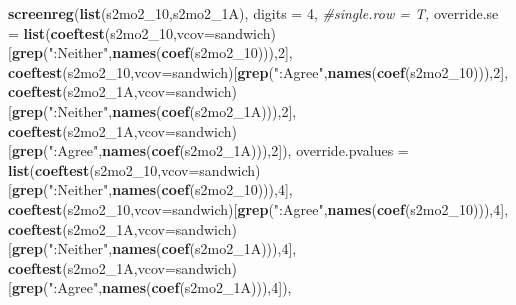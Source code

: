 \documentclass[
]{article}
\newenvironment{Shaded}{\begin{snugshade}}{\end{snugshade}}
\newcommand{\CommentTok}[1]{\textcolor[rgb]{0.56,0.35,0.01}{\textit{#1}}}
\newcommand{\DataTypeTok}[1]{\textcolor[rgb]{0.13,0.29,0.53}{#1}}
\newcommand{\DecValTok}[1]{\textcolor[rgb]{0.00,0.00,0.81}{#1}}
\newcommand{\KeywordTok}[1]{\textcolor[rgb]{0.13,0.29,0.53}{\textbf{#1}}}
\newcommand{\NormalTok}[1]{#1}
\newcommand{\StringTok}[1]{\textcolor[rgb]{0.31,0.60,0.02}{#1}}
\begin{document}
\begin{Shaded}
\begin{Highlighting}[]
\KeywordTok{screenreg}\NormalTok{(}\KeywordTok{list}\NormalTok{(s2mo2_}\DecValTok{10}\NormalTok{,s2mo2_1A), }\DataTypeTok{digits =} \DecValTok{4}\NormalTok{, }\CommentTok{#single.row = T,}
          \DataTypeTok{override.se =} \KeywordTok{list}\NormalTok{(}\KeywordTok{coeftest}\NormalTok{(s2mo2_}\DecValTok{10}\NormalTok{,}\DataTypeTok{vcov=}\NormalTok{sandwich)[}\KeywordTok{grep}\NormalTok{(}\StringTok{":Neither"}\NormalTok{,}\KeywordTok{names}\NormalTok{(}\KeywordTok{coef}\NormalTok{(s2mo2_}\DecValTok{10}\NormalTok{))),}\DecValTok{2}\NormalTok{],}
                             \KeywordTok{coeftest}\NormalTok{(s2mo2_}\DecValTok{10}\NormalTok{,}\DataTypeTok{vcov=}\NormalTok{sandwich)[}\KeywordTok{grep}\NormalTok{(}\StringTok{":Agree"}\NormalTok{,}\KeywordTok{names}\NormalTok{(}\KeywordTok{coef}\NormalTok{(s2mo2_}\DecValTok{10}\NormalTok{))),}\DecValTok{2}\NormalTok{],}
                             \KeywordTok{coeftest}\NormalTok{(s2mo2_1A,}\DataTypeTok{vcov=}\NormalTok{sandwich)[}\KeywordTok{grep}\NormalTok{(}\StringTok{":Neither"}\NormalTok{,}\KeywordTok{names}\NormalTok{(}\KeywordTok{coef}\NormalTok{(s2mo2_1A))),}\DecValTok{2}\NormalTok{],}
                             \KeywordTok{coeftest}\NormalTok{(s2mo2_1A,}\DataTypeTok{vcov=}\NormalTok{sandwich)[}\KeywordTok{grep}\NormalTok{(}\StringTok{":Agree"}\NormalTok{,}\KeywordTok{names}\NormalTok{(}\KeywordTok{coef}\NormalTok{(s2mo2_1A))),}\DecValTok{2}\NormalTok{]),}
          \DataTypeTok{override.pvalues =} \KeywordTok{list}\NormalTok{(}\KeywordTok{coeftest}\NormalTok{(s2mo2_}\DecValTok{10}\NormalTok{,}\DataTypeTok{vcov=}\NormalTok{sandwich)[}\KeywordTok{grep}\NormalTok{(}\StringTok{":Neither"}\NormalTok{,}\KeywordTok{names}\NormalTok{(}\KeywordTok{coef}\NormalTok{(s2mo2_}\DecValTok{10}\NormalTok{))),}\DecValTok{4}\NormalTok{],}
                                  \KeywordTok{coeftest}\NormalTok{(s2mo2_}\DecValTok{10}\NormalTok{,}\DataTypeTok{vcov=}\NormalTok{sandwich)[}\KeywordTok{grep}\NormalTok{(}\StringTok{":Agree"}\NormalTok{,}\KeywordTok{names}\NormalTok{(}\KeywordTok{coef}\NormalTok{(s2mo2_}\DecValTok{10}\NormalTok{))),}\DecValTok{4}\NormalTok{],}
                                  \KeywordTok{coeftest}\NormalTok{(s2mo2_1A,}\DataTypeTok{vcov=}\NormalTok{sandwich)[}\KeywordTok{grep}\NormalTok{(}\StringTok{":Neither"}\NormalTok{,}\KeywordTok{names}\NormalTok{(}\KeywordTok{coef}\NormalTok{(s2mo2_1A))),}\DecValTok{4}\NormalTok{],}
                                  \KeywordTok{coeftest}\NormalTok{(s2mo2_1A,}\DataTypeTok{vcov=}\NormalTok{sandwich)[}\KeywordTok{grep}\NormalTok{(}\StringTok{":Agree"}\NormalTok{,}\KeywordTok{names}\NormalTok{(}\KeywordTok{coef}\NormalTok{(s2mo2_1A))),}\DecValTok{4}\NormalTok{]),}

\end{Highlighting}
\end{Shaded}
\end{document}
